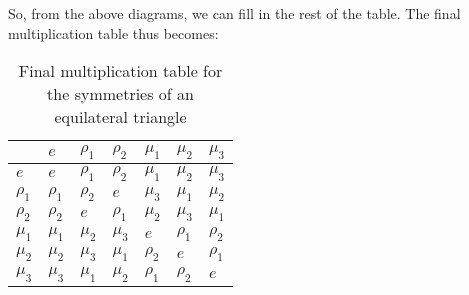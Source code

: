 \begin{figure}[H]
    \centering
    
\end{figure}
\begin{figure}[H]
    \centering
    
\end{figure}
\begin{figure}[H]
    \centering
    
\end{figure}
\begin{figure}[H]
    \centering
    
\end{figure}
\begin{figure}[H]
    \centering
    
\end{figure}
\begin{figure}[H]
    \centering
    
\end{figure}
\begin{figure}[H]
    \centering
    
\end{figure}
\noindent
So, from the above diagrams, we can fill in the rest of the table. The final multiplication table thus becomes:
\begin{table}[H]
\centering
\renewcommand{\arraystretch}{1.6} %
\begin{tabular}{|
    >{\centering\arraybackslash}p{}|
    >{\centering\arraybackslash}p{}|
    >{\centering\arraybackslash}p{}|
    >{\centering\arraybackslash}p{}|
    >{\centering\arraybackslash}p{}|
    >{\centering\arraybackslash}p{}|
    >{\centering\arraybackslash}p{}|
    }
\hline
\text{\Large $*$} & $e$ & $\rho_1$ & $\rho_2$ & $\mu_1$ & $\mu_2$ & $\mu_3$ \\
\hline
$e $   &  $e$ & $\rho_1$ & $\rho_2$ & $\mu_1$ & $\mu_2$ & $\mu_3$   \\
\hline
$\rho_1$ & $\rho_1$   &  $\rho_2$  &  $e$ &  $\mu_3$ & $\mu_1$  & $\mu_2$  \\
\hline
$\rho_2$ &  $\rho_2$  & $e$  &   $\rho_1$ & $\mu_2$  &  $\mu_3$ & $\mu_1$  \\
\hline
$\mu_1$  & $\mu_1$   &   $\mu_2$ &  $\mu_3$  &$e$   &  $\rho_1$ &   $\rho_2$\\
\hline
$\mu_2$  & $\mu_2$  &   $\mu_3$ &  $\mu_1$  & $\rho_2$  & $e$  &  $\rho_1$ \\
\hline
$\mu_3$  &  $\mu_3$ &  $\mu_1$  &  $\mu_2$  &  $\rho_1$ & $\rho_2$  &  $e$ \\
\hline
\end{tabular}
\caption{Final multiplication table for the symmetries of an equilateral triangle}
\end{table}
